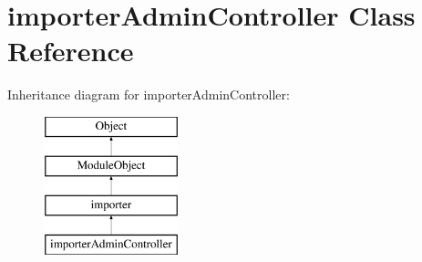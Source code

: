 \hypertarget{classimporterAdminController}{}\section{importer\+Admin\+Controller Class Reference}
\label{classimporterAdminController}
Inheritance diagram for importer\+Admin\+Controller\+:\begin{figure}[H]
\begin{center}
\leavevmode
\includegraphics[height=4.000000cm]{classimporterAdminController}
\end{center}
\end{figure}
